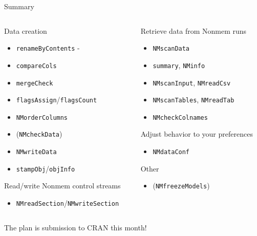 \documentclass[
  8pt,
  ignorenonframetext,
  aspectratio=169]{beamer}
\providecommand{\tightlist}{%
  \setlength{\itemsep}{0pt}\setlength{\parskip}{0pt}}
\begin{document}
\begin{frame}[fragile]{Summary}
\begin{columns}[T]
\begin{column}{0.48\textwidth}
Data creation

\begin{itemize}
\tightlist
\item
  \texttt{renameByContents} -
\item
  \texttt{compareCols}
\item
  \texttt{mergeCheck}
\item
  \texttt{flagsAssign}/\texttt{flagsCount}
\item
  \texttt{NMorderColumns}
\item
  (\texttt{NMcheckData})
\item
  \texttt{NMwriteData}
\item
  \texttt{stampObj}/\texttt{objInfo}
\end{itemize}

Read/write Nonmem control streams

\begin{itemize}
\tightlist
\item
  \texttt{NMreadSection}/\texttt{NMwriteSection}
\end{itemize}
\end{column}

\begin{column}{0.48\textwidth}
Retrieve data from Nonmem runs

\begin{itemize}
\tightlist
\item
  \texttt{NMscanData}
\item
  \texttt{summary}, \texttt{NMinfo}
\item
  \texttt{NMscanInput}, \texttt{NMreadCsv}
\item
  \texttt{NMscanTables}, \texttt{NMreadTab}
\item
  \texttt{NMcheckColnames}
\end{itemize}

Adjust behavior to your preferences

\begin{itemize}
\tightlist
\item
  \texttt{NMdataConf}
\end{itemize}

Other

\begin{itemize}
\tightlist
\item
  (\texttt{NMfreezeModels})
\end{itemize}
\end{column}
\end{columns}

\begin{block}{The plan is submission to CRAN this month!}
\protect\hypertarget{the-plan-is-submission-to-cran-this-month}{}
\end{block}
\end{frame}
\end{document}
